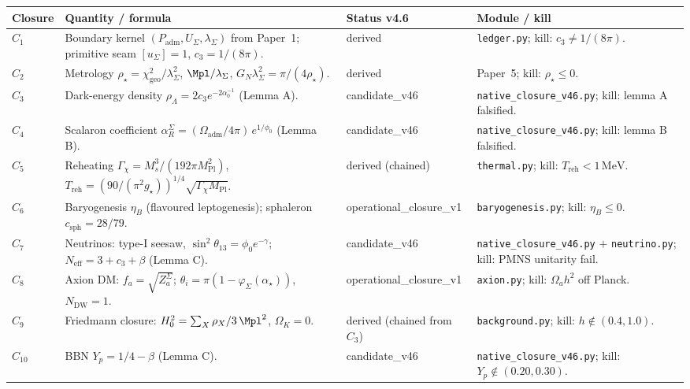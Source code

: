 \begin{center}
\renewcommand{\arraystretch}{1.18}
\begin{tabularx}{\textwidth}{@{}p{}p{}p{}Y@{}}
\toprule
\textbf{Closure} & \textbf{Quantity / formula} & \textbf{Status v4.6} & \textbf{Module / kill} \\
\midrule
\(C_1\)  & Boundary kernel \((P_{\mathrm{adm}}, U_\Sigma, \lambda_\Sigma)\) from Paper~1; primitive seam \([u_\Sigma]=1\), \(c_3=1/(8\pi)\). & derived & \texttt{ledger.py}; kill: \(c_3\neq 1/(8\pi)\). \\
\(C_2\)  & Metrology \(\rho_\star=\chi_{\mathrm{geo}}^2/\lambda_\Sigma^2\), \(\Mpl/\lambda_\Sigma\), \(G_N\lambda_\Sigma^2=\pi/(4\rho_\star)\). & derived & Paper~5; kill: \(\rho_\star\le 0\). \\
\(C_3\)  & Dark-energy density \(\rho_\Lambda=2c_3 e^{-2\alpha_0^{-1}}\) (Lemma A). & \textsf{candidate\_v46} & \texttt{native\_closure\_v46.py}; kill: lemma A falsified. \\
\(C_4\)  & Scalaron coefficient \(\alpha_R^\Sigma=(\Omega_{\mathrm{adm}}/4\pi)\,e^{1/\phi_0}\) (Lemma B). & \textsf{candidate\_v46} & \texttt{native\_closure\_v46.py}; kill: lemma B falsified. \\
\(C_5\)  & Reheating \(\Gamma_\chi=M_s^3/(192\pi M_{\mathrm{Pl}}^2)\), \(T_{\mathrm{reh}}=(90/(\pi^2 g_\star))^{1/4}\sqrt{\Gamma_\chi M_{\mathrm{Pl}}}\). & derived (chained) & \texttt{thermal.py}; kill: \(T_{\mathrm{reh}}<1\,\mathrm{MeV}\). \\
\(C_6\)  & Baryogenesis \(\eta_B\) (flavoured leptogenesis); sphaleron \(c_{\mathrm{sph}}=28/79\). & operational\_closure\_v1 & \texttt{baryogenesis.py}; kill: \(\eta_B\le 0\). \\
\(C_7\)  & Neutrinos: type-I seesaw, \(\sin^2\theta_{13}=\phi_0 e^{-\gamma}\); \(N_{\mathrm{eff}}=3+c_3+\beta\) (Lemma C). & \textsf{candidate\_v46} & \texttt{native\_closure\_v46.py} \(+\) \texttt{neutrino.py}; kill: PMNS unitarity fail. \\
\(C_8\)  & Axion DM: \(f_a=\sqrt{Z_a^\Sigma}\); \(\theta_i=\pi(1-\varphi_\Sigma(\alpha_\star))\), \(N_{\mathrm{DW}}=1\). & operational\_closure\_v1 & \texttt{axion.py}; kill: \(\Omega_a h^2\) off Planck. \\
\(C_9\)  & Friedmann closure: \(H_0^2=\sum_X\rho_X/3\,\Mpl^2\), \(\Omega_K=0\). & derived (chained from \(C_3\)) & \texttt{background.py}; kill: \(h\notin(0.4,1.0)\). \\
\(C_{10}\)  & BBN \(Y_p=1/4-\beta\) (Lemma C). & \textsf{candidate\_v46} & \texttt{native\_closure\_v46.py}; kill: \(Y_p\notin(0.20,0.30)\). \\

\end{tabularx}
\end{center}

